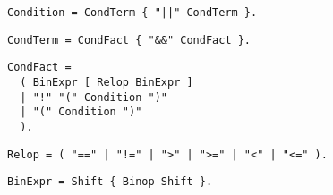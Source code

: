 
\begin{samepage}
\begin{lstlisting}[language=EBNF]
Condition = CondTerm { "||" CondTerm }.
\end{lstlisting}
\end{samepage}


\begin{samepage}
\begin{lstlisting}[language=EBNF]
CondTerm = CondFact { "&&" CondFact }.
\end{lstlisting}
\end{samepage}


\begin{samepage}
\begin{lstlisting}[language=EBNF]
CondFact = 
  ( BinExpr [ Relop BinExpr ] 
  | "!" "(" Condition ")" 
  | "(" Condition ")" 
  ).
\end{lstlisting}
\end{samepage}


\begin{samepage}
\begin{lstlisting}[language=EBNF]
Relop = ( "==" | "!=" | ">" | ">=" | "<" | "<=" ).
\end{lstlisting}
\end{samepage}


\begin{samepage}
\begin{lstlisting}[language=EBNF]
BinExpr = Shift { Binop Shift }.
\end{lstlisting}
\end{samepage}


